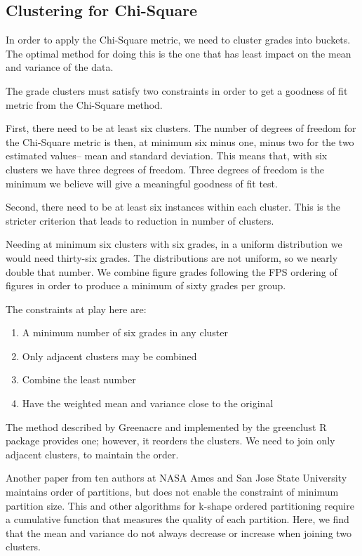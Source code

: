 \subsection{Clustering for Chi-Square}

In order to apply the Chi-Square metric, we need to cluster grades into
buckets.
The optimal method for doing this is the one that has least impact on
the mean and variance of the data.

The grade clusters must satisfy two constraints in order to get a goodness
of fit metric from the Chi-Square method.

First, there need to be at least six clusters. The number of degrees of freedom
for the Chi-Square metric is then, at minimum six minus one, minus two for
the two estimated values-- mean and standard deviation. This means that, with
six clusters we have three degrees of freedom. Three degrees of freedom
is the minimum we believe will give a meaningful goodness of fit test.

Second, there need to be at least six instances within each cluster. This is
the stricter criterion that leads to reduction in number of clusters.

Needing at minimum six clusters with six grades, in a uniform distribution
we would need thirty-six grades. The distributions are not uniform, so we
nearly double that number. We combine figure grades following the FPS ordering
of figures in order to produce a minimum of sixty grades per group.

The constraints at play here are:

\begin{enumerate}
\item{A minimum number of six grades in any cluster}
\item{Only adjacent clusters may be combined}
\item{Combine the least number}
\item{Have the weighted mean and variance close to the original}
\end{enumerate}

The method described by
Greenacre \cite{Greenacre}
and implemented by the
greenclust \cite{greenclust}
R package provides one; however, it reorders the clusters.
We need to join only adjacent clusters, to maintain the order.

Another paper
\cite{partitioning}
from ten authors at NASA Ames and San Jose State University
maintains order of partitions, but does not enable the constraint of
minimum partition size. This and other algorithms for k-shape
ordered partitioning require a cumulative
function that measures the quality of each partition.
Here, we find that the mean and variance do not always decrease or
increase when joining two clusters.

